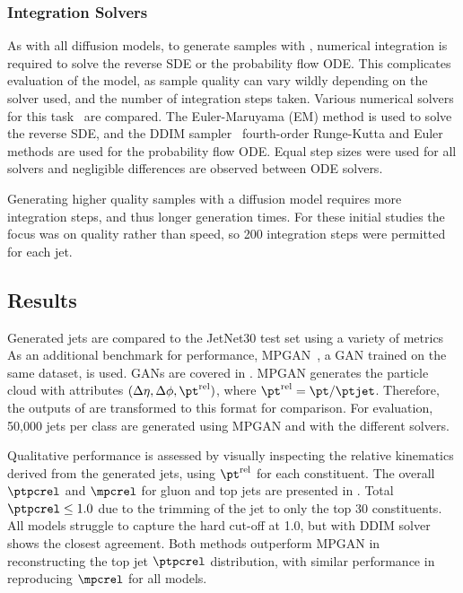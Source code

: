 \subsubsection{Integration Solvers}

As with all diffusion models, to generate samples with \pcjedi, numerical integration is required to solve the reverse SDE or the probability flow ODE\@.
This complicates evaluation of the model, as sample quality can vary wildly depending on the solver used, and the number of integration steps taken.
Various numerical solvers for this task~\cite{NumericalSolutionStochastic} are compared.
The Euler-Maruyama (EM) method is used to solve the reverse SDE, and the DDIM sampler~\cite{DDIM} fourth-order Runge-Kutta and Euler methods are used for the probability flow ODE.
Equal step sizes were used for all solvers and negligible differences are observed between ODE solvers.

Generating higher quality samples with a diffusion model requires more integration steps, and thus longer generation times.
For these initial studies the focus was on quality rather than speed, so 200 integration steps were permitted for each jet.

\subsection{Results}

Generated jets are compared to the JetNet30 test set using a variety of metrics
As an additional benchmark for performance, MPGAN~\cite{MPGAN}, a GAN trained on the same dataset, is used.
GANs are covered in .
MPGAN generates the particle cloud with attributes $(\Delta\eta, \Delta\phi, \pt^\text{rel})$, where $\pt^\text{rel} = \pt / \ptjet$.
Therefore, the outputs of \pcjedi are transformed to this format for comparison.
For evaluation, 50,000 jets per class are generated using MPGAN and \pcjedi with the different solvers.

Qualitative performance is assessed by visually inspecting the relative kinematics derived from the generated jets, using $\pt^\text{rel}$ for each constituent.
The overall $\ptpcrel$ and $\mpcrel$ for gluon and top jets are presented in .
Total $\ptpcrel\leq1.0$ due to the trimming of the jet to only the top 30 constituents.
All models struggle to capture the hard cut-off at 1.0, but \pcjedi with DDIM solver shows the closest agreement.
Both \pcjedi methods outperform MPGAN in reconstructing the top jet $\ptpcrel$ distribution, with similar performance in reproducing $\mpcrel$ for all models.

